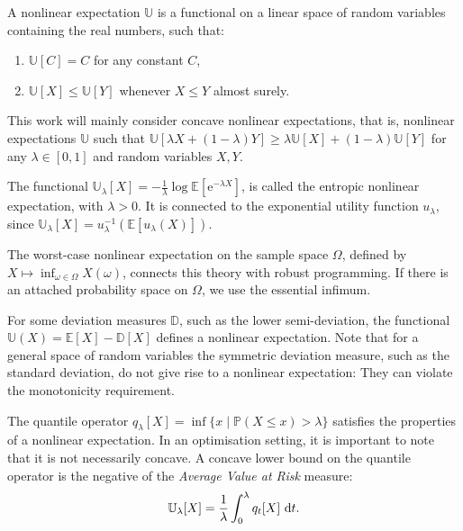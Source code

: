 \documentclass[main.tex]{subfiles}
\begin{document}
\begin{mydef}
  A nonlinear expectation $\mathbb U$ is a functional on a linear space of random
  variables containing the real numbers, such that:
  \begin{enumerate}
  \item $\mathbb U[C] = C$ for any constant $C$,
  \item $\mathbb U[X]\leq \mathbb U[Y]$ whenever $X\leq Y$ almost surely.
  \end{enumerate}
  This work will mainly consider concave nonlinear expectations, that
  is, nonlinear expectations $\mathbb{U}$ such that
  $\mathbb{U}[\lambda X + (1-\lambda)Y]\geq \lambda\mathbb{U}[X] +
  (1-\lambda) \mathbb{U}[Y]$ for any $\lambda\in[0,1]$ and random
  variables $X,Y$.
\end{mydef}

\begin{example}
  The functional $\mathbb U_\lambda[X]=-\frac{1}{\lambda}\log\mathbb
  E[\mathrm{e}^{-\lambda X}]$, is called the entropic nonlinear expectation,
  with $\lambda>0$.
  It is connected to the exponential utility function $u_\lambda$, since
  $\mathbb U_\lambda[X]= u_\lambda^{-1}(\mathbb E[u_\lambda(X)])$.

  The worst-case nonlinear expectation on the sample space $\Omega$,
  defined by
  $X\mapsto  \inf_{\omega\in\Omega}X(\omega)$, connects this theory with robust
  programming. If there is an attached probability space on $\Omega$,
  we use the essential infimum.

  For some deviation measures $\mathbb D$, such as the lower
  semi-deviation, the functional $\mathbb U(X)=\mathbb E[X]-\mathbb
  D[X]$ defines a nonlinear expectation. Note that for a general space
  of random variables the symmetric deviation measure, such as the
  standard deviation, do not give rise to a nonlinear
  expectation: They can violate the monotonicity requirement.

  The quantile operator
  $q_\lambda[X] = \inf\{x\mid\mathbb P(X\leq x)>
  \lambda\}$ satisfies the properties of a nonlinear expectation.
  In an optimisation setting, it is important to note that it is not
  necessarily concave.
  A concave lower bound on the quantile operator is
  the negative of the \emph{Average Value at Risk} measure:
  \begin{align}
    \mathbb U_\lambda[X]=\frac{1}{\lambda}\int_0^\lambda q_t[X]\,\,\mathrm{d}t.
  \end{align}
\end{example}
\end{document}
